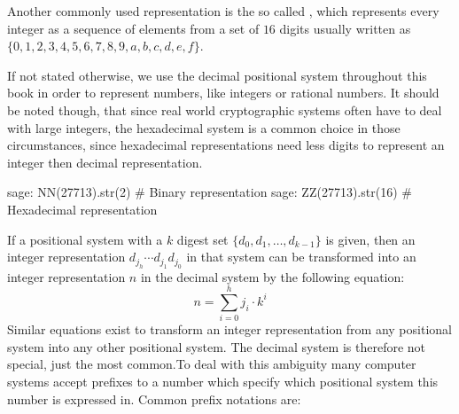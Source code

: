 Another commonly used representation is the so called , which represents every integer as a sequence of elements from a set of $16$ digits usually written as $\{0,1,2,3,4,5,6,7,8,9,a,b,c,d,e,f\}$. 

If not stated otherwise, we use the decimal positional system throughout this book in order to represent numbers, like integers or rational numbers. It should be noted though, that since real world cryptographic systems often have to deal with large integers, the hexadecimal system is a common choice in those circumstances, since hexadecimal representations need less digits to represent an integer then decimal representation.  
\begin{sagecommandline}
sage: NN(27713).str(2) # Binary representation
sage: ZZ(27713).str(16) # Hexadecimal representation
\end{sagecommandline}
If a positional system with a $k$ digest set $\{d_0,d_1,\ldots, d_{k-1}\}$ is given, then an integer representation $d_{j_h}\cdots d_{j_1} d_{j_0}$ in that system can be transformed into 
an integer representation $n$ in the decimal system by the following equation:
\begin{equation}
\label{eq:from-k-digits-to-deci}
n = \sum_{i=0}^h j_i\cdot k^{i}
\end{equation}
Similar equations exist to transform an integer representation from any positional system into any other positional system. The decimal system is therefore not special, just the most common.To deal with this ambiguity many computer systems accept prefixes to a number which specify which positional system this number is expressed in. Common prefix notations are:
 
